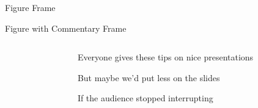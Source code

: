 \documentclass[notes,11pt, aspectratio=169]{beamer}
\newenvironment{wideitemize}{\itemize\addtolength{\itemsep}{10pt}}{\enditemize}
\begin{document}
\begin{frame}{Figure Frame}
\begin{center}
\end{center}
\end{frame}

\begin{frame}{Figure with Commentary Frame}
\begin{columns}[T] %
\begin{column}{.58\textwidth}
\end{column}%
\hfill%
\begin{column}{.38\textwidth}
  \begin{wideitemize}
  \item Everyone gives these tips on nice presentations
  \item But maybe we'd put less on the slides
  \item If the audience stopped interrupting
  \end{wideitemize}
\end{column}%
\end{columns}
\end{frame}
\end{document}
